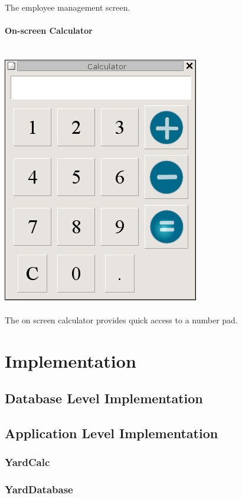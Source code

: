 \documentclass{report}
\begin{document}
\\
The employee management screen.\\
\\
{\bf On-screen Calculator}\\
\\
\\
\includegraphics{ys_calc_screener.png}\\
\\
The on screen calculator provides quick access to a number pad.


\chapter{Implementation}

	\section{Database Level Implementation}

	\section{Application Level Implementation}

	\subsection{YardCalc}

	\subsection{YardDatabase}
\end{document}
